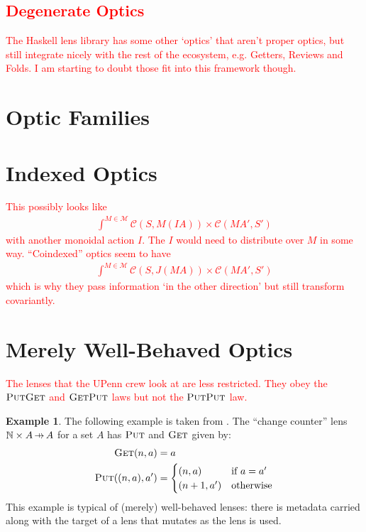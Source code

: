 \documentclass[11pt,a4paper]{article}
\theoremstyle{plain}
\theoremstyle{definition}
\newtheorem{example}[theorem]{Example}
\newcommand{\C}{\mathscr{C}}
\newcommand{\M}{\mathscr{M}}
\newcommand{\bN}{\mathbb{N}}
\newcommand{\fget}{\textsc{Get}}
\newcommand{\fput}{\textsc{Put}}
\newcommand{\hto}{\ensuremath{\,\mathaccent\shortmid\rightarrow\,}}
\newcommand{\todo}[1]{\textcolor{red}{\small #1}}
\begin{document}
\todo{
\section{Degenerate Optics}
The Haskell lens library has some other `optics' that aren't proper optics, but still integrate nicely with the rest of the ecosystem, e.g. Getters, Reviews and Folds. I am starting to doubt those fit into this framework though.}

\section{Optic Families}


\section{Indexed Optics}
\todo{
This possibly looks like
\begin{align*}
\int^{M \in \M} \C(S, M(IA)) \times \C(M A', S')
\end{align*}
with another monoidal action $I$. The $I$ would need to distribute over $M$ in some way. ``Coindexed'' optics seem to have 
\begin{align*}
\int^{M \in \M} \C(S, J(MA)) \times \C(M A', S')
\end{align*}
which is why they pass information `in the other direction' but still transform covariantly.
}

\section{Merely Well-Behaved Optics}
\todo{
The lenses that the UPenn crew look at are less restricted. They obey the $\fput\fget$ and $\fget\fput$ laws but not the $\fput\fput$ law. 
}

\begin{example}
The following example is taken from \cite{AClearPictureOfLensLaws}. The ``change counter'' lens $\bN \times A \hto A$ for a set $A$ has $\fput$ and $\fget$ given by:
\begin{align*}
\fget(n, a) &= a \\
\fput((n, a), a') &= \begin{cases}
(n, a) & \text{if } a = a' \\
(n+1, a') & \text{otherwise}
\end{cases}
\end{align*}
This example is typical of (merely) well-behaved lenses: there is metadata carried along with the target of a lens that mutates as the lens is used.
\end{example}
\end{document}
